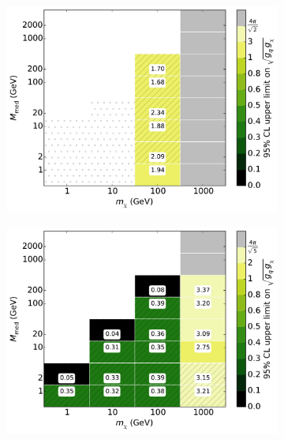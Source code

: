 \begin{figure}[h]
\begin{subfigure}[t]{0.325\textwidth}
      \includegraphics[width=1.\textwidth]{figures/grid_basepoints_SVD_rat2_monoWZ.pdf}
      \caption{}
    \end{subfigure}
    \begin{subfigure}[t]{0.325\textwidth}
      \centering
      \includegraphics[width=1.\textwidth]{figures/grid_basepoints_SVD_rat5_monojet.pdf}
      \caption{}
    \end{subfigure}
    \begin{subfigure}[t]{0.325\textwidth}
      \centering

\end{subfigure}
\end{figure}
